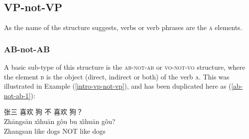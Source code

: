 \documentclass[12pt, UTF8]{article}
\begin{document}
\begin{exe}
\avmvskip{.5ex}\avmhskip{2em}\avmbskip{.3em}

\end{exe}



\newpage

\subsection{VP-not-VP}
As the name of the structure suggests, verbs or verb phrases are the \textsc{a} elements. 


\subsubsection{AB-not-AB}

A basic sub-type of this structure is the \textsc{ab-not-ab} or \textsc{vo-not-vo} structure, where the element \textsc{b} is the object (direct, indirect or both) of the verb \textsc{a}. This was illustrated in Example (\ref{intro-vp-not-vp}), and has been duplicated here as (\ref{ab-not-ab-1}):

\begin{exe}
\ex\label{ab-not-ab-1}{
	\glll 
	张三 喜欢 狗 不 喜欢 狗？\\
	Zh\={a}ngs\={a}n x\^{\i}hu\={a}n g\^{o}u bu x\^{\i}hu\={a}n g\^{o}u?\\
	Zhangsan like dogs NOT like dogs\\
}
\end{exe}
\end{document}
